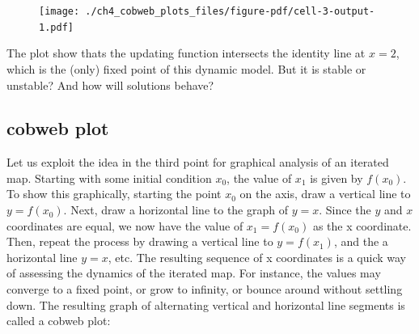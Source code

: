 \documentclass[
  letterpaper,
  DIV=11,
  numbers=noendperiod]{scrreprt}
\begin{document}
\begin{figure}[H]

{\centering \texttt{[image: ./ch4\_cobweb\_plots\_files/figure-pdf/cell-3-output-1.pdf]}

}

\end{figure}

The plot show thats the updating function intersects the identity line
at \(x=2\), which is the (only) fixed point of this dynamic model. But
it is stable or unstable? And how will solutions behave?

\hypertarget{cobweb-plot}{%
\subsection{cobweb plot}\label{cobweb-plot}}

Let us exploit the idea in the third point for graphical analysis of an
iterated map. Starting with some initial condition \(x_0\), the value of
\(x_1\) is given by \(f(x_0)\). To show this graphically, starting the
point \(x_0\) on the axis, draw a vertical line to \(y=f(x_0)\). Next,
draw a horizontal line to the graph of \(y=x\). Since the \(y\) and
\(x\) coordinates are equal, we now have the value of \(x_1 = f(x_0)\)
as the x coordinate. Then, repeat the process by drawing a vertical line
to \(y=f(x_1)\), and the a horizontal line \(y=x\), etc. The resulting
sequence of x coordinates is a quick way of assessing the dynamics of
the iterated map. For instance, the values may converge to a fixed
point, or grow to infinity, or bounce around without settling down. The
resulting graph of alternating vertical and horizontal line segments is
called a cobweb plot:
\end{document}
